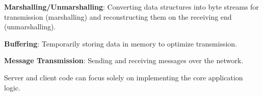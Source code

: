 \begin{slide}

    
    \textbf{Marshalling/Unmarshalling}: Converting data structures into byte streams for transmission (marshalling) and reconstructing them on the receiving end (unmarshalling).
    \bigskip

    \textbf{Buffering}: Temporarily storing data in memory to optimize transmission.
    \bigskip

    \textbf{Message Transmission}: Sending and receiving messages over the network.
    \bigskip

    Server and client code can focus solely on implementing the core application logic.

\end{slide}


